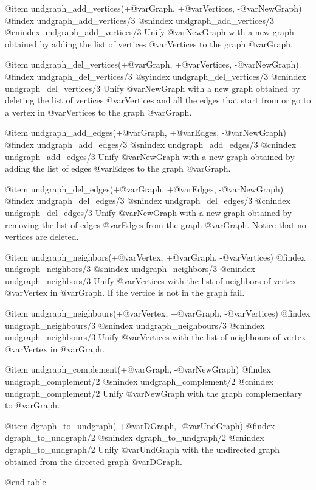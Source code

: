 @item undgraph_add_vertices(+@var{Graph}, +@var{Vertices}, -@var{NewGraph})
@findex  undgraph_add_vertices/3
@snindex undgraph_add_vertices/3
@cnindex undgraph_add_vertices/3
Unify @var{NewGraph} with a new graph obtained by adding the list of
vertices @var{Vertices} to the graph @var{Graph}.

@item undgraph_del_vertices(+@var{Graph}, +@var{Vertices}, -@var{NewGraph})
@findex  undgraph_del_vertices/3
@syindex undgraph_del_vertices/3
@cnindex undgraph_del_vertices/3
Unify @var{NewGraph} with a new graph obtained by deleting the list of
vertices @var{Vertices} and all the edges that start from or go to a
vertex in @var{Vertices} to the graph @var{Graph}.

@item undgraph_add_edges(+@var{Graph}, +@var{Edges}, -@var{NewGraph})
@findex  undgraph_add_edges/3
@snindex undgraph_add_edges/3
@cnindex undgraph_add_edges/3
Unify @var{NewGraph} with a new graph obtained by adding the list of
edges @var{Edges} to the graph @var{Graph}.

@item undgraph_del_edges(+@var{Graph}, +@var{Edges}, -@var{NewGraph})
@findex  undgraph_del_edges/3
@snindex undgraph_del_edges/3
@cnindex undgraph_del_edges/3
Unify @var{NewGraph} with a new graph obtained by removing the list of
edges @var{Edges} from the graph @var{Graph}. Notice that no vertices
are deleted.

@item undgraph_neighbors(+@var{Vertex}, +@var{Graph}, -@var{Vertices})
@findex  undgraph_neighbors/3
@snindex undgraph_neighbors/3
@cnindex undgraph_neighbors/3
Unify @var{Vertices} with the list of neighbors of vertex @var{Vertex}
in @var{Graph}. If the vertice is not in the graph fail.

@item undgraph_neighbours(+@var{Vertex}, +@var{Graph}, -@var{Vertices})
@findex  undgraph_neighbours/3
@snindex undgraph_neighbours/3
@cnindex undgraph_neighbours/3
Unify @var{Vertices} with the list of neighbours of vertex @var{Vertex}
in @var{Graph}.

@item undgraph_complement(+@var{Graph}, -@var{NewGraph})
@findex  undgraph_complement/2
@snindex undgraph_complement/2
@cnindex undgraph_complement/2
Unify @var{NewGraph} with the graph complementary to @var{Graph}.

@item dgraph_to_undgraph( +@var{DGraph}, -@var{UndGraph})
@findex  dgraph_to_undgraph/2
@snindex dgraph_to_undgraph/2
@cnindex dgraph_to_undgraph/2
Unify @var{UndGraph} with the undirected graph obtained from the
directed graph @var{DGraph}.

@end table

